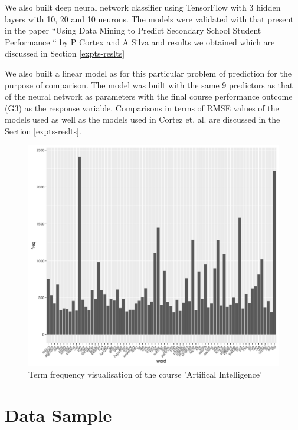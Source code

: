 \documentclass[conference]{IEEEtran}
\begin{document}
We also built deep neural network classifier using TensorFlow \cite{tensorflow2015-whitepaper} with
3 hidden layers with 10, 20 and 10 neurons. The models were validated with that present
in the paper “Using Data Mining to Predict Secondary School Student Performance “ by
P Cortex and A Silva and results we obtained which are discussed in Section \ref{expts-reslts}

We also built a linear model as for this particular problem of prediction for the purpose of comparison. The model was built with the same 9 predictors as that of the neural network as parameters with the final course performance outcome (G3) as the response variable.
Comparisons in terms of RMSE values of the models used as well as the models used
in Cortez et. al.\cite{ref:4} are discussed in the Section \ref{expts-reslts}.

\begin{figure}
	\includegraphics[width=\linewidth]{ai-vis.jpg}
	\caption{Term frequency visualisation of the course 'Artifical Intelligence'}
	\label{fig:ai-vis}
\end{figure}

	\section{Data Sample}
\end{document}
